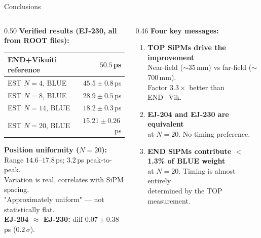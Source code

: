 \documentclass[aspectratio=169,9pt]{beamer}
\begin{document}
\begin{frame}{Conclusions}
\begin{columns}[T]
\begin{column}{0.50\textwidth}
\footnotesize
\textbf{Verified results (EJ-230, all from ROOT files):}

\vspace{0.3em}
\renewcommand{\arraystretch}{1.25}
\begin{tabular}{lr}
\toprule
END+Vikuiti reference & $50.5$\,ps\\
\midrule
\rowcolor{rownew}
EST $N{=}4$, BLUE  & $45.5\pm0.8$\,ps\\
\rowcolor{rownew}
EST $N{=}8$, BLUE  & $28.9\pm0.5$\,ps\\
\rowcolor{rownew}
EST $N{=}14$, BLUE & $18.2\pm0.3$\,ps\\
\rowcolor{rowbest}
EST $N{=}20$, BLUE & $\mathbf{15.21\pm0.26}$\,ps\\
\bottomrule
\end{tabular}

\vspace{0.4em}
\textbf{Position uniformity ($N{=}20$):}\\
Range $14.6$--$17.8$\,ps; $3.2$\,ps peak-to-peak.\\
Variation is real, correlates with SiPM spacing.\\
"Approximately uniform" — not statistically flat.\\[0.3em]
\textbf{EJ-204 $\approx$ EJ-230:} diff $0.07\pm0.38$\,ps ($0.2\,\sigma$).
\end{column}

\begin{column}{0.46\textwidth}
\footnotesize
\textbf{Four key messages:}\\[0.3em]
\begin{enumerate}
  \item \textbf{TOP SiPMs drive the improvement}\\
        Near-field ($\sim$35\,mm) vs far-field ($\sim$700\,mm).\\
        Factor $3.3\times$ better than END+Vik.

  \vspace{0.2em}
  \item \textbf{EJ-204 and EJ-230 are equivalent}\\
        at $N{=}20$. No timing preference.

  \vspace{0.2em}
  \item \textbf{END SiPMs contribute $<$1.3\% of BLUE weight}\\
        at $N{=}20$. Timing is almost entirely\\
        determined by the TOP measurement.


\end{enumerate}
\end{column}
\end{columns}
\end{frame}
\end{document}
